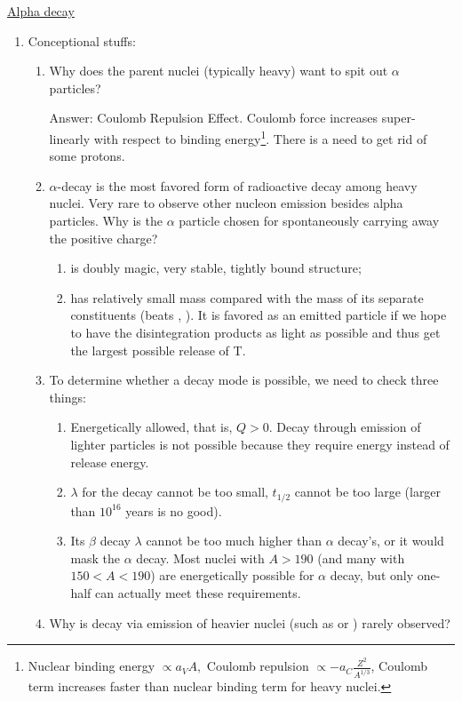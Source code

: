 \documentclass{school-22.101-notes}
\begin{document}
\clearpage
\uline{Alpha decay}
\begin{enumerate}
\item Conceptional stuffs:
\begin{enumerate} 
\item Why does the parent nuclei (typically heavy) want to spit out $\alpha$ particles? 

Answer: Coulomb Repulsion Effect. Coulomb force increases super-linearly with respect to binding energy\footnote{Nuclear binding energy $\propto a_V A,$ Coulomb repulsion $\propto -a_C \frac{Z^2}{A^{1/3}}$, Coulomb term increases faster than nuclear binding term for heavy nuclei.}. There is a need to get rid of some protons.  
\item $\alpha$-decay is the most favored form of radioactive decay among heavy nuclei. Very rare to observe other nucleon emission besides alpha particles. Why is the $\alpha$ particle chosen for spontaneously carrying away the positive charge?
    \begin{enumerate}
    \item {} is doubly magic, very stable, tightly bound structure;
    \item {} has relatively small mass compared with the mass of its separate constituents (beats , ). It is favored as an emitted particle if we hope to have the disintegration products as light as possible and thus get the largest possible release of T. 
    \end{enumerate}
\item To determine whether a decay mode is possible, we need to check three things:
    \begin{enumerate}
    \item Energetically allowed, that is, $Q > 0$. Decay through emission of lighter particles is not possible because they require energy instead of release energy.
    \item $\lambda$ for the decay cannot be too small, $t_{1/2}$ cannot be too large (larger than $10^{16}$ years is no good). 
    \item Its $\beta$ decay $\lambda$ cannot be too much higher than $\alpha$ decay's, or it would mask the $\alpha$ decay. Most nuclei with $A>190$ (and many with $150 < A < 190$) are energetically possible for $\alpha$ decay, but only one-half can actually meet these requirements.
    \end{enumerate}
\item Why is decay via emission of heavier nuclei (such as  or ) rarely observed? 


\end{enumerate}
\end{enumerate}
\end{document}

